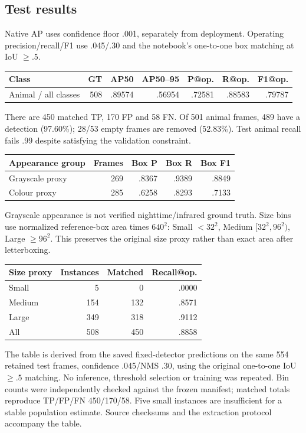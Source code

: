 \documentclass[11pt,a4paper]{article}
\begin{document}
\subsection{Test results}
Native AP uses confidence floor .001, separately from deployment. Operating precision/recall/F1 use .045/.30 and the notebook's one-to-one box matching at IoU $\geq .5$.
\begin{center}\begin{tabular}{lrrrrrr}\toprule
Class & GT & AP50 & AP50--95 & P@op. & R@op. & F1@op.\\\midrule
Animal / all classes & 508 & .89574 & .56954 & .72581 & .88583 & .79787\\\bottomrule
\end{tabular}\end{center}
There are 450 matched TP, 170 FP and 58 FN. Of 501 animal frames, 489 have a detection (97.60\%); 28/53 empty frames are removed (52.83\%). Test animal recall fails .99 despite satisfying the validation constraint.
\begin{center}\begin{tabular}{lrrrr}\toprule
Appearance group & Frames & Box P & Box R & Box F1\\\midrule
Grayscale proxy & 269 & .8367 & .9389 & .8849\\
Colour proxy & 285 & .6258 & .8293 & .7133\\\bottomrule
\end{tabular}\end{center}
Grayscale appearance is not verified nighttime/infrared ground truth. Size bins use normalized reference-box area times $640^2$: Small $<32^2$, Medium $[32^2,96^2)$, Large $\geq96^2$. This preserves the original size proxy rather than exact area after letterboxing.
\begin{center}\begin{tabular}{lrrr}\toprule
Size proxy & Instances & Matched & Recall@op.\\\midrule
Small & 5 & 0 & .0000\\
Medium & 154 & 132 & .8571\\
Large & 349 & 318 & .9112\\\midrule
All & 508 & 450 & .8858\\\bottomrule
\end{tabular}\end{center}
The table is derived from the saved fixed-detector predictions on the same 554 retained test frames, confidence .045/NMS .30, using the original one-to-one IoU $\geq .5$ matching. No inference, threshold selection or training was repeated. Bin counts were independently checked against the frozen manifest; matched totals reproduce TP/FP/FN 450/170/58. Five small instances are insufficient for a stable population estimate. Source checksums and the extraction protocol accompany the table.
\end{document}
